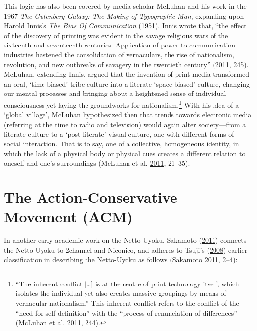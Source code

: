 \documentclass[10pt,british,A4paper,,openany]{memoir}
\begin{document}
This logic has also been covered by media scholar McLuhan and his work
in the 1967 \emph{The Gutenberg Galaxy: The Making of Typographic Man},
expanding upon Harold Innis's \emph{The Bias Of Communication} (1951).
Innis wrote that, ``the effect of the discovery of printing was evident
in the savage religious wars of the sixteenth and seventeenth centuries.
Application of power to communication industries hastened the
consolidation of vernaculars, the rise of nationalism, revolution, and
new outbreaks of savagery in the twentieth century''
(\protect\hyperlink{ref-mcluhan_gutenberg_2011}{2011}, 245). McLuhan,
extending Innis, argued that the invention of print-media transformed an
oral, `time-biased' tribe culture into a literate `space-biased'
culture, changing our mental processes and bringing about a heightened
sense of individual consciousness yet laying the groundworks for
nationalism.\footnote{``The inherent conflict {[}\ldots{}{]} is at the
  centre of print technology itself, which isolates the individual yet
  also creates massive groupings by means of vernacular nationalism.''
  This inherent conflict refers to the conflict of the ``need for
  self-definition'' with the ``process of renunciation of differences''
  (McLuhan et al. \protect\hyperlink{ref-mcluhan_gutenberg_2011}{2011},
  244).} With his idea of a `global village', McLuhan hypothesized then
that trends towards electronic media (referring at the time to radio and
television) would again alter society---from a literate culture to a
`post-literate' visual culture, one with different forms of social
interaction. That is to say, one of a collective, homogeneous identity,
in which the lack of a physical body or physical cues creates a
different relation to oneself and one's surroundings (McLuhan et al.
\protect\hyperlink{ref-mcluhan_gutenberg_2011}{2011}, 21--35).

\section{The Action-Conservative Movement
(ACM)}\label{the-action-conservative-movement-acm}

In another early academic work on the Netto-Uyoku, Sakamoto
(\protect\hyperlink{ref-sakamoto_koreans_2011}{2011}) connects the
Netto-Uyoku to 2channel and Niconico, and adheres to Tsuji's
(\protect\hyperlink{ref-tsuji_eng:_2008}{2008}) earlier classification
in describing the Netto-Uyoku as follows (Sakamoto
\protect\hyperlink{ref-sakamoto_koreans_2011}{2011}, 2--4):
\end{document}
